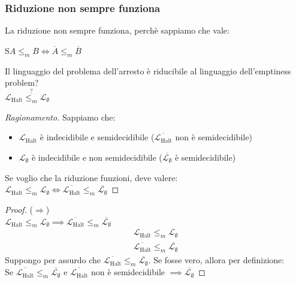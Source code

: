 \documentclass{article}  %
\theoremstyle{definition}
\newenvironment{ragionamento}[1][]
  {\begin{proof}[Ragionamento#1]\renewcommand{\qedsymbol}{}\normalfont}
  {\end{proof}}
\begin{document}
\subsubsection{Riduzione non sempre funziona}
La riduzione non sempre funziona, perchè sappiamo che vale:
\begin{theorem}{3.5}
	S$A \leq_m B \iff \overline{A} \leq_m \overline{B}$
\end{theorem}
\begin{esercizio}[Esempio 3.5]
	\footnotesize %
	Il linguaggio del problema dell'arresto è riducibile al linguaggio dell'emptiness problem? \\
	$\mathcal{L}_{\text{Halt}} \overset{?}{\leq_m} \mathcal{L}_{\emptyset}$
	\begin{ragionamento}
		Sappiamo che:
		\begin{itemize}
			\item $\mathcal{L}_{\text{Halt}}$ è indecidibile e semidecidibile ($\overline{\mathcal{L}_{\text{Halt}}}$ non è semidecidibile)
			\item $\mathcal{L}_{\emptyset}$ è indecidibile e non semidecidibile ($\overline{\mathcal{L}_{\emptyset}}$ è semidecidibile)
		\end{itemize}
		Se voglio che la riduzione funzioni, deve valere: \\
		$\mathcal{L}_{\text{Halt}} \leq_m \mathcal{L}_{\emptyset} \iff \overline{\mathcal{L}_{\text{Halt}}} \leq_m \overline{\mathcal{L}_{\emptyset}}$
	\end{ragionamento}
	\begin{proof}
		($\Longrightarrow$) \\
		$\mathcal{L}_{\text{Halt}} \leq_m \mathcal{L}_{\emptyset} \implies \overline{\mathcal{L}_{\text{Halt}}} \leq_m \overline{\mathcal{L}_{\emptyset}}$
		\begin{align*}
			\mathcal{L}_{\text{Halt}} \leq_m \mathcal{L}_{\emptyset} \tag*{(ipotesi)}
		\end{align*}
		\begin{align*}
			\overline{\mathcal{L}_{\text{Halt}}} \leq_m \overline{\mathcal{L}_{\emptyset}} \tag*{(tesi)}
		\end{align*}
		Suppongo per assurdo che $\overline{\mathcal{L}_{\text{Halt}}} \leq_m \overline{\mathcal{L}_{\emptyset}}$. Se fosse vero, allora per definizione: \\
		Se $\overline{\mathcal{L}_{\text{Halt}}} \leq_m \overline{\mathcal{L}_{\emptyset}}$ e $\overline{\mathcal{L}_{\text{Halt}}}$ non è semidecidibile $\implies \overline{\mathcal{L}_{\emptyset}}$

\end{proof}
\end{esercizio}
\end{document}
